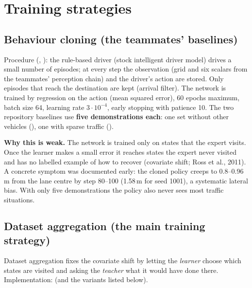 \section{Training strategies}\label{sec:training}

\subsection{Behaviour cloning (the teammates' baselines)}
Procedure (, ): the rule-based driver (stock intelligent driver model) drives a small number of episodes; at every step the observation (grid and six scalars from the teammates' perception chain) and the driver's action are stored.
Only episodes that reach the destination are kept (arrival filter). The network is trained by regression on the action (mean squared error), 60 epochs maximum, batch size 64, learning rate $3\cdot10^{-4}$, early stopping with patience 10.
The two repository baselines use \textbf{five demonstrations each}: one set without other vehicles (), one with sparse traffic ().

\textbf{Why this is weak.} The network is trained only on states that the expert visits. Once the learner makes a small error it reaches states the expert never visited and has no labelled example of how to recover (covariate shift; Ross et al., 2011).
A concrete symptom was documented early: the cloned policy creeps to 0.8--0.96\,m from the lane centre by step 80--100 (1.58\,m for seed 1001), a systematic lateral bias. With only five demonstrations the policy also never sees most traffic situations.

\subsection{Dataset aggregation (the main training strategy)}
Dataset aggregation fixes the covariate shift by letting the \emph{learner} choose which states are visited and asking the \emph{teacher} what it would have done there. Implementation:  (and the variants listed below).

